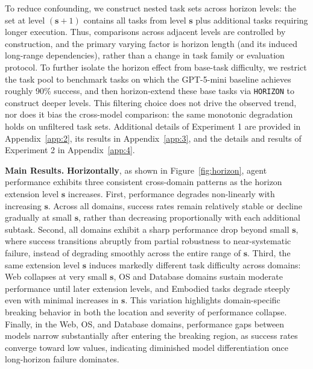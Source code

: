 \documentclass[11pt]{article}
\begin{document}
To reduce confounding, we construct nested task sets across horizon levels: the set at level $(\mathbf{s}{+}1)$ contains all tasks from level $\mathbf{s}$ plus additional tasks requiring longer execution. 
Thus, comparisons across adjacent levels are controlled by construction, and the primary varying factor is horizon length (and its induced long-range dependencies), rather than a change in task family or evaluation protocol. 
To further isolate the horizon effect from base-task difficulty, we restrict the task pool to benchmark tasks on which the GPT-5-mini baseline achieves roughly 90\% success, and then horizon-extend these base tasks via \texttt{HORIZON} to construct deeper levels.
This filtering choice does not drive the observed trend, nor does it bias the cross-model comparison: the same monotonic degradation holds on unfiltered task sets. Additional details of Experiment 1 are provided in Appendix~\ref{app:2}, its results in Appendix~\ref{app:3}, and the details and results of Experiment 2 in Appendix~\ref{app:4}.


\textbf{Main Results.} \textbf{Horizontally}, as shown in Figure~\ref{fig:horizon}, agent performance exhibits three consistent cross-domain patterns as the horizon extension level $\mathbf{s}$ increases.
First, performance degrades non-linearly with increasing $\mathbf{s}$. Across all domains, success rates remain relatively stable or decline gradually at small $\mathbf{s}$, rather than decreasing proportionally with each additional subtask.
Second, all domains exhibit a sharp performance drop beyond small $\mathbf{s}$, where success transitions abruptly from partial robustness to near-systematic failure, instead of degrading smoothly across the entire range of $\mathbf{s}$.
Third, the same extension level $\mathbf{s}$ induces markedly different task difficulty across domains: Web collapses at very small $\mathbf{s}$, OS and Database domains sustain moderate performance until later extension levels, and Embodied tasks degrade steeply even with minimal increases in $\mathbf{s}$. This variation highlights domain-specific breaking behavior in both the location and severity of performance collapse.
Finally, in the Web, OS, and Database domains, performance gaps between models narrow substantially after entering the breaking region, as success rates converge toward low values, indicating diminished model differentiation once long-horizon failure dominates.
\end{document}
